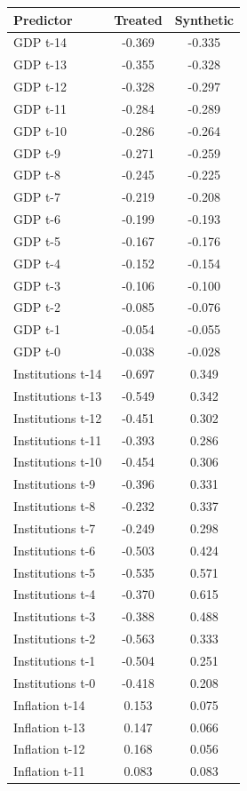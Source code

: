 \begin{tabular}{lcc}
\hline\hline
Predictor & Treated & Synthetic \\
\hline
GDP t-14 & -0.369 & -0.335 \\
GDP t-13 & -0.355 & -0.328 \\
GDP t-12 & -0.328 & -0.297 \\
GDP t-11 & -0.284 & -0.289 \\
GDP t-10 & -0.286 & -0.264 \\
GDP t-9 & -0.271 & -0.259 \\
GDP t-8 & -0.245 & -0.225 \\
GDP t-7 & -0.219 & -0.208 \\
GDP t-6 & -0.199 & -0.193 \\
GDP t-5 & -0.167 & -0.176 \\
GDP t-4 & -0.152 & -0.154 \\
GDP t-3 & -0.106 & -0.100 \\
GDP t-2 & -0.085 & -0.076 \\
GDP t-1 & -0.054 & -0.055 \\
GDP t-0 & -0.038 & -0.028 \\
Institutions t-14 & -0.697 & 0.349 \\
Institutions t-13 & -0.549 & 0.342 \\
Institutions t-12 & -0.451 & 0.302 \\
Institutions t-11 & -0.393 & 0.286 \\
Institutions t-10 & -0.454 & 0.306 \\
Institutions t-9 & -0.396 & 0.331 \\
Institutions t-8 & -0.232 & 0.337 \\
Institutions t-7 & -0.249 & 0.298 \\
Institutions t-6 & -0.503 & 0.424 \\
Institutions t-5 & -0.535 & 0.571 \\
Institutions t-4 & -0.370 & 0.615 \\
Institutions t-3 & -0.388 & 0.488 \\
Institutions t-2 & -0.563 & 0.333 \\
Institutions t-1 & -0.504 & 0.251 \\
Institutions t-0 & -0.418 & 0.208 \\
Inflation t-14 & 0.153 & 0.075 \\
Inflation t-13 & 0.147 & 0.066 \\
Inflation t-12 & 0.168 & 0.056 \\
Inflation t-11 & 0.083 & 0.083 \\

\end{tabular}

